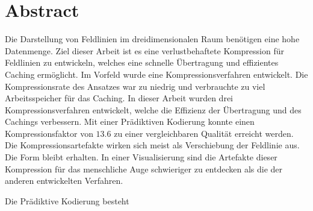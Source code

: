 \section*{Abstract}
Die Darstellung von Feldlinien im dreidimensionalen Raum benötigen eine hohe Datenmenge. Ziel dieser Arbeit ist es eine verlustbehaftete Kompression für Feldlinien zu entwickeln, welches eine schnelle Übertragung und effizientes Caching ermöglicht. Im Vorfeld wurde eine Kompressionsverfahren entwickelt. Die Kompressionsrate des Ansatzes war zu niedrig und verbrauchte zu viel Arbeitsspeicher für das Caching. In dieser Arbeit wurden drei Kompressionsverfahren entwickelt, welche die Effizienz der Übertragung und des Cachings verbessern. Mit einer Prädiktiven Kodierung konnte einen Kompressionsfaktor von $13.6$ zu einer vergleichbaren Qualität erreicht werden. Die Kompressionsartefakte wirken sich meist als Verschiebung der Feldlinie aus. Die Form bleibt erhalten. In einer Visualisierung sind die Artefakte dieser Kompression für das menschliche Auge schwieriger zu entdecken als die der anderen entwickelten Verfahren.

Die Prädiktive Kodierung besteht